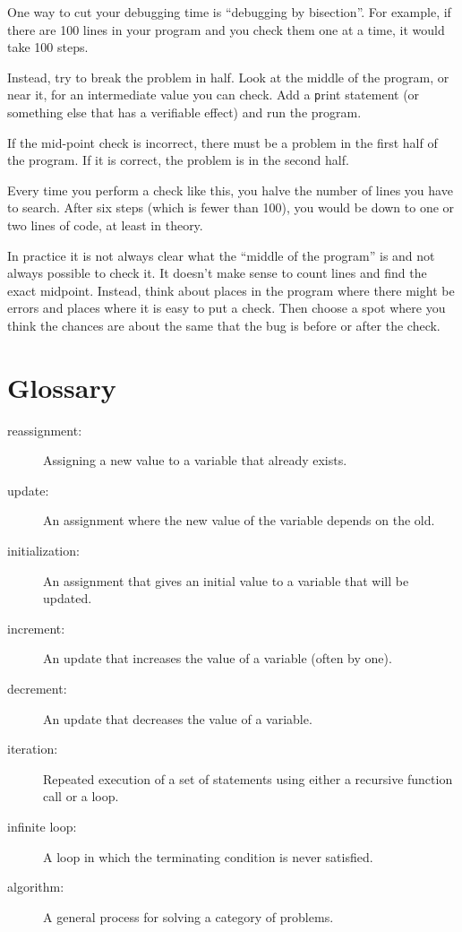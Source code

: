 \documentclass[
DIV=11,
fontsize=13,
twoside,
headinclude=false,
titlepage=firstiscover,
abstract=true,
headsepline=true,
footsepline=true,
chapterprefix=true, %
headings=big,
bibliography=totoc,%
captions=tableheading
]{scrbook}
\theoremstyle{definition}
\begin{document}
One way to cut your debugging time is ``debugging by bisection''.
For example, if there are 100 lines in your program and you
check them one at a time, it would take 100 steps.

Instead, try to break the problem in half.  Look at the middle
of the program, or near it, for an intermediate value you
can check.  Add a {\texttt print} statement (or something else
that has a verifiable effect) and run the program.

If the mid-point check is incorrect, there must be a problem in the
first half of the program.  If it is correct, the problem is
in the second half.

Every time you perform a check like this, you halve the number of
lines you have to search.  After six steps (which is fewer than 100),
you would be down to one or two lines of code, at least in theory.

In practice it is not always clear what
the ``middle of the program'' is and not always possible to
check it.  It doesn't make sense to count lines and find the
exact midpoint.  Instead, think about places
in the program where there might be errors and places where it
is easy to put a check.  Then choose a spot where you
think the chances are about the same that the bug is before
or after the check.




\section{Glossary}

\begin{description}

\item[reassignment:] Assigning a new value to a variable that
already exists.

\item[update:] An assignment where the new value of the variable
depends on the old.

\item[initialization:] An assignment that gives an initial value to
a variable that will be updated.

\item[increment:] An update that increases the value of a variable
(often by one).

\item[decrement:] An update that decreases the value of a variable.

\item[iteration:] Repeated execution of a set of statements using
either a recursive function call or a loop.

\item[infinite loop:] A loop in which the terminating condition is
never satisfied.

\item[algorithm:]  A general process for solving a category of
problems.

\end{description}
\end{document}

